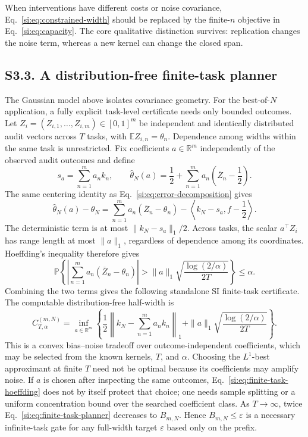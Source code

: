 \documentclass[10pt,twocolumn]{article}
\newcommand{\Prb}{\mathbb{P}}
\newcommand{\E}{\mathbb{E}}
\begin{document}
When interventions have different costs or noise covariance, Eq.~\ref{si:eq:constrained-width} should be replaced by the finite-$n$ objective in Eq.~\ref{si:eq:capacity}. The core qualitative distinction survives: replication changes the noise term, whereas a new kernel can change the closed span.

\subsection*{S3.3. A distribution-free finite-task planner}

The Gaussian model above isolates covariance geometry. For the best-of-$N$ application, a fully explicit task-level certificate needs only bounded outcomes. Let $Z_i=(Z_{i,1},\ldots,Z_{i,m})\in[0,1]^m$ be independent and identically distributed audit vectors across $T$ tasks, with $\E Z_{i,n}=\theta_n$. Dependence among widths within the same task is unrestricted. Fix coefficients $a\in\mathbb R^m$ independently of the observed audit outcomes and define
\begin{equation}
s_a=\sum_{n=1}^ma_nk_n,
\qquad
\widehat\theta_N(a)=\frac12+\sum_{n=1}^ma_n
\left(\overline Z_n-\frac12\right).
\label{si:eq:finite-task-estimator}
\end{equation}
The same centering identity as Eq.~\ref{si:eq:error-decomposition} gives
\begin{equation}
\widehat\theta_N(a)-\theta_N
=\sum_{n=1}^ma_n(\overline Z_n-\theta_n)
-\left\langle k_N-s_a,f-\frac12\right\rangle.
\label{si:eq:finite-task-decomposition}
\end{equation}
The deterministic term is at most $\|k_N-s_a\|_1/2$. Across tasks, the scalar $a^\top Z_i$ has range length at most $\|a\|_1$, regardless of dependence among its coordinates. Hoeffding's inequality therefore gives
\begin{equation}
\Prb\left\{
\left|\sum_{n=1}^ma_n(\overline Z_n-\theta_n)\right|
>\|a\|_1\sqrt{\frac{\log(2/\alpha)}{2T}}
\right\}\le\alpha.
\label{si:eq:finite-task-hoeffding}
\end{equation}
Combining the two terms gives the following standalone SI finite-task certificate. The computable distribution-free half-width is
\begin{equation}
C_{T,\alpha}^{(m,N)}
=\inf_{a\in\mathbb R^m}
\left\{
\frac12\left\|k_N-\sum_{n=1}^ma_nk_n\right\|_1
+\|a\|_1\sqrt{\frac{\log(2/\alpha)}{2T}}
\right\}.
\label{si:eq:finite-task-planner}
\end{equation}
This is a convex bias--noise tradeoff over outcome-independent coefficients, which may be selected from the known kernels, $T$, and $\alpha$. Choosing the $L^1$-best approximant at finite $T$ need not be optimal because its coefficients may amplify noise. If $a$ is chosen after inspecting the same outcomes, Eq.~\ref{si:eq:finite-task-hoeffding} does not by itself protect that choice; one needs sample splitting or a uniform concentration bound over the searched coefficient class. As $T\to\infty$, twice Eq.~\ref{si:eq:finite-task-planner} decreases to $B_{m,N}$. Hence $B_{m,N}\le\varepsilon$ is a necessary infinite-task gate for any full-width target $\varepsilon$ based only on the prefix.
\end{document}
